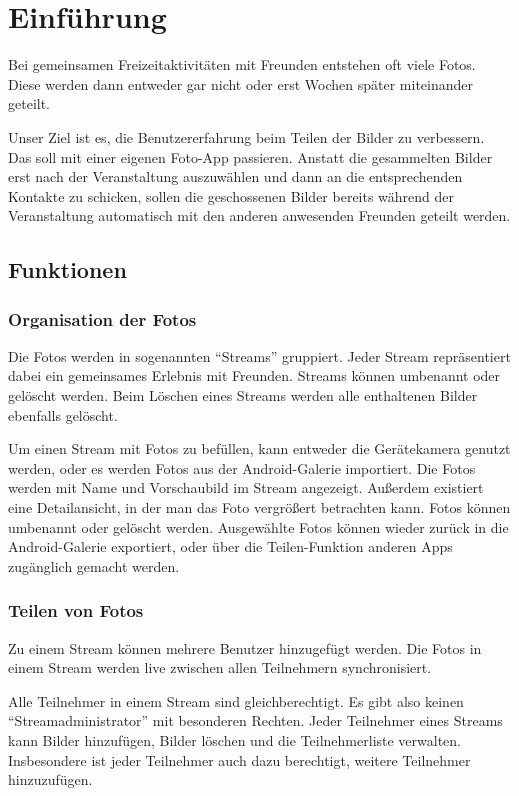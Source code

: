 
\chapter{Einführung}

Bei gemeinsamen Freizeitaktivitäten mit Freunden entstehen oft viele Fotos. Diese werden dann entweder gar nicht oder erst Wochen später miteinander geteilt.

Unser Ziel ist es, die Benutzererfahrung beim Teilen der Bilder zu verbessern. Das soll mit einer eigenen Foto-App passieren. Anstatt die gesammelten Bilder erst nach der Veranstaltung auszuwählen und dann an die entsprechenden Kontakte zu schicken, sollen die geschossenen Bilder bereits während der Veranstaltung automatisch mit den anderen anwesenden Freunden geteilt werden.

\section{Funktionen}

\subsection{Organisation der Fotos}
Die Fotos werden in sogenannten \enquote{Streams} gruppiert. Jeder Stream repräsentiert dabei ein gemeinsames Erlebnis mit Freunden. Streams können umbenannt oder gelöscht werden. Beim Löschen eines Streams werden alle enthaltenen Bilder ebenfalls gelöscht.

Um einen Stream mit Fotos zu befüllen, kann entweder die Gerätekamera genutzt werden, oder es werden Fotos aus der Android-Galerie importiert. Die Fotos werden mit Name und Vorschaubild im Stream angezeigt. Außerdem existiert eine Detailansicht, in der man das Foto vergrößert betrachten kann. Fotos können umbenannt oder gelöscht werden. Ausgewählte Fotos können wieder zurück in die Android-Galerie exportiert, oder über die Teilen-Funktion anderen Apps zugänglich gemacht werden.

\subsection{Teilen von Fotos}
Zu einem Stream können mehrere Benutzer hinzugefügt werden. Die Fotos in einem Stream werden live zwischen allen Teilnehmern synchronisiert.

Alle Teilnehmer in einem Stream sind gleichberechtigt. Es gibt also keinen \enquote{Streamadministrator} mit besonderen Rechten. Jeder Teilnehmer eines Streams kann Bilder hinzufügen, Bilder löschen und die Teilnehmerliste verwalten. Insbesondere ist jeder Teilnehmer auch dazu berechtigt, weitere Teilnehmer hinzuzufügen.

